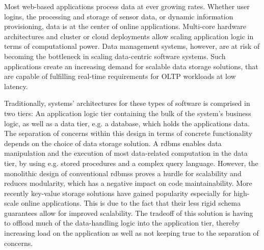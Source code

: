 
  Most web-based applications process data at ever growing rates.
  Whether user logins, the processing and storage of sensor data, or dynamic information provisioning, data is at the center of online applications.
  Multi-core hardware architectures and cluster or cloud deployments allow scaling application logic in terms of computational power.
  Data management systems, however, are at risk of becoming the bottleneck in scaling data-centric software systems.
  Such applications create an increasing demand for scalable data storage solutions, that are capable of fulfilling real-time requirements for OLTP workloads at low latency. %

  Traditionally, systems' architectures for these types of software is comprised in two tiers:
  An application logic tier containing the bulk of the system's business logic, as well as a data tier, e.g. a database, which holds the applications data.
  The separation of concerns within this design in terms of concrete functionality depends on the choice of data storage solution.
  A \gls{rdbms} enables data manipulation and the execution of most data-related computation in the data tier, by using e.g. stored procedures and a complex query language.
  However, the monolithic design of conventional \glspl{rdbms} proves a hurdle for scalability and reduces modularity, which has a negative impact on code maintainability. %
  More recently key-value storage solutions have gained popularity especially for high-scale online applications.
  This is due to the fact that their less rigid schema guarantees allow for improved scalability. %
  The tradeoff of this solution is having to offload much of the data-handling logic into the application tier, thereby increasing load on the application as well as not keeping true to the separation of concerns.

